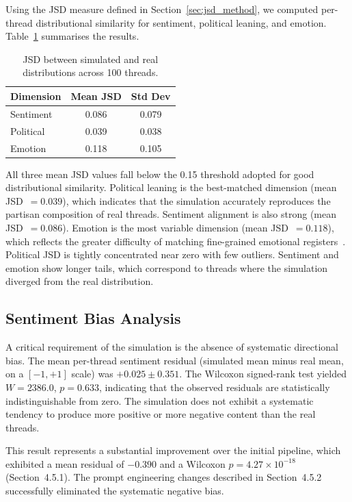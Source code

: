 \documentclass[logo,bsc,singlespacing,parskip,online]{infthesis}
\begin{document}
Using the JSD measure defined in Section~\ref{sec:jsd_method}, we computed per-thread distributional similarity for sentiment, political leaning, and emotion. Table~\ref{tab:jsd_results} summarises the results.

\begin{table}[ht]
\centering
\caption{JSD between simulated and real distributions across 100 threads.}
\label{tab:jsd_results}
\begin{tabular}{lcc}
\toprule
\textbf{Dimension} & \textbf{Mean JSD} & \textbf{Std Dev} \\
\midrule
Sentiment   & 0.086 & 0.079 \\
Political   & 0.039 & 0.038 \\
Emotion     & 0.118 & 0.105 \\
\bottomrule
\end{tabular}
\end{table}

All three mean JSD values fall below the 0.15 threshold adopted for good distributional similarity. Political leaning is the best-matched dimension (mean JSD~$= 0.039$), which indicates that the simulation accurately reproduces the partisan composition of real threads. Sentiment alignment is also strong (mean JSD~$= 0.086$). Emotion is the most variable dimension (mean JSD~$= 0.118$), which reflects the greater difficulty of matching fine-grained emotional registers~\citep{antypas2023negativity,brady2017emotion}. Political JSD is tightly concentrated near zero with few outliers. Sentiment and emotion show longer tails, which correspond to threads where the simulation diverged from the real distribution.

\subsection{Sentiment Bias Analysis}

A critical requirement of the simulation is the absence of systematic directional bias. The mean per-thread sentiment residual (simulated mean minus real mean, on a $[-1, +1]$ scale) was $+0.025 \pm 0.351$. The Wilcoxon signed-rank test yielded $W = 2386.0$, $p = 0.633$, indicating that the observed residuals are statistically indistinguishable from zero. The simulation does not exhibit a systematic tendency to produce more positive or more negative content than the real threads.

This result represents a substantial improvement over the initial pipeline, which exhibited a mean residual of $-0.390$ and a Wilcoxon $p = 4.27 \times 10^{-18}$ (Section~4.5.1). The prompt engineering changes described in Section~4.5.2 successfully eliminated the systematic negative bias.
\end{document}
